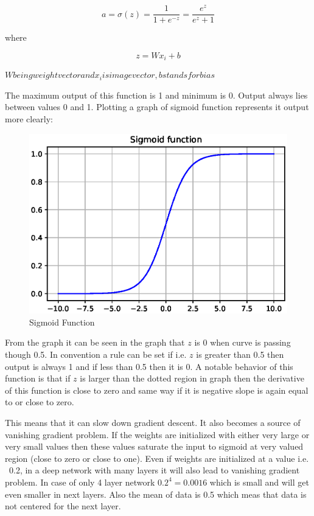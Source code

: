 \documentclass[11pt]{article}
\begin{document}
\begin{equation}
a = \sigma(z) = \frac{1}{1+e^{-z}}=\frac{e^{z}}{e^{z}+1}
\end{equation}

where

\begin{equation}
z = Wx_i + b
\end{equation}

$W being weight vector and x_i is image vector, b stands for bias$


The maximum output of this function is 1 and minimum is 0. Output always lies between values 0 and 1. Plotting a graph of sigmoid function represents it output more clearly:

\begin{figure}[ht!]
	\centering
	\includegraphics[width=.6\linewidth]{files/cnn_architecture/sigmoid.eps}
	\caption{Sigmoid Function}
	\label{fig: Sigmoid}
\end{figure}

From the graph it can be seen in the graph that $z$ is 0 when curve is passing though 0.5. In convention a rule can be set if i.e. $z$ is greater than 0.5 then output is always 1 and if less than 0.5 then it is 0. A notable behavior of this function is that if $z$ is larger than the dotted region in graph then the derivative of this function is close to zero and same way if it is negative slope is again equal to or close to zero. 

This means that it can slow down gradient descent. It also becomes a source of vanishing gradient problem. If the weights are initialized with either very large or very small values then these values saturate the input to sigmoid at very valued region (close to zero or close to one). Even if weights are initialized at a value i.e. ~0.2, in a deep network with many layers it will also lead to vanishing gradient problem. In case of only 4 layer network $0.2^{4}=0.0016$ which is small and will get even smaller in next layers. Also the mean of data is 0.5 which meas that data is not centered for the next layer. 
\end{document}
